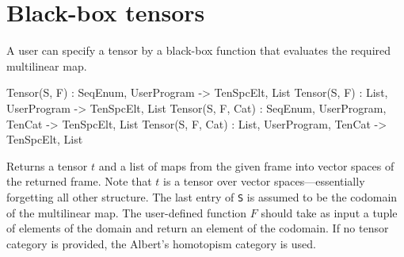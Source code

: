 \documentclass{documentation}
\begin{document}
\section{Black-box tensors}
A user can specify a tensor by a black-box function that evaluates the required
multilinear map.

\begin{intrinsics}
Tensor(S, F) : SeqEnum, UserProgram -> TenSpcElt, List
Tensor(S, F) : List, UserProgram -> TenSpcElt, List
Tensor(S, F, Cat) : SeqEnum, UserProgram, TenCat -> TenSpcElt, List
Tensor(S, F, Cat) : List, UserProgram, TenCat -> TenSpcElt, List
\end{intrinsics}

Returns a tensor $t$ and a list of maps from the given frame into vector spaces of the returned frame.
Note that $t$ is a tensor over vector spaces---essentially forgetting all other structure.
The last entry of \texttt{S} is assumed to be the codomain of the multilinear map. 
The user-defined function $F$ should take as input a tuple of elements of the domain and return an element of the codomain.
If no tensor category is provided, the Albert's homotopism category is used.
\end{document}
